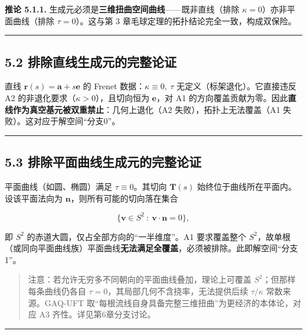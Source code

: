\textbf{推论 5.1.1.}
生成元必须是\textbf{三维扭曲空间曲线}------既非直线（排除
\(\kappa=0\)）亦非平面曲线（排除 \(\tau=0\)）。这与第 3
章毛球定理的拓扑结论完全一致，构成双保险。

\begin{center}\rule{0.5\linewidth}{0.5pt}\end{center}

\subsection{5.2
排除直线生成元的完整论证}\label{ux6392ux9664ux76f4ux7ebfux751fux6210ux5143ux7684ux5b8cux6574ux8bbaux8bc1}

直线 \(\mathbf{r}(s)=\mathbf{a}+s\mathbf{e}\) 的 Frenet
数据：\(\kappa\equiv0,\ \tau\) 无定义（标架退化）。它直接违反 A2
的非退化要求（\(\kappa>0\)），且切向恒为 \(\mathbf{e}\)，对 A1
的方向覆盖贡献为零。因此\textbf{直线作为真空基元被双重禁止}：几何上退化（A2
失败），拓扑上无法覆盖（A1 失败）。这对应于解空间``分支0''。

\begin{center}\rule{0.5\linewidth}{0.5pt}\end{center}

\subsection{5.3
排除平面曲线生成元的完整论证}\label{ux6392ux9664ux5e73ux9762ux66f2ux7ebfux751fux6210ux5143ux7684ux5b8cux6574ux8bbaux8bc1}

平面曲线（如圆、椭圆）满足 \(\tau\equiv0\)。其切向 \(\mathbf{T}(s)\)
始终位于曲线所在平面内。设该平面法向为
\(\mathbf{n}\)，则所有可能的切向落在集合

\[
\{\mathbf{v}\in S^2\ :\ \mathbf{v}\cdot\mathbf{n}=0\},
\]

即 \(S^2\) 的赤道大圆，仅占全部方向的``一半维度''。A1 要求覆盖整个
\(S^2\)，故单根（或同向平面曲线族）平面曲线\textbf{无法满足全覆盖}，必须被排除。此即解空间``分支1''。

\begin{quote}
注意：若允许无穷多不同朝向的平面曲线叠加，理论上可覆盖
\(S^2\)；但那样每条曲线仍各自
\(\tau=0\)，其局部几何不含挠率，无法提供后续 \(\tau/\kappa\)
常数来源。GAQ‑UFT
取``每根流线自身具备完整三维扭曲''为更经济的本体论，对应 A3
齐性。详见第6章分支讨论。
\end{quote}

\begin{center}\rule{0.5\linewidth}{0.5pt}\end{center}

